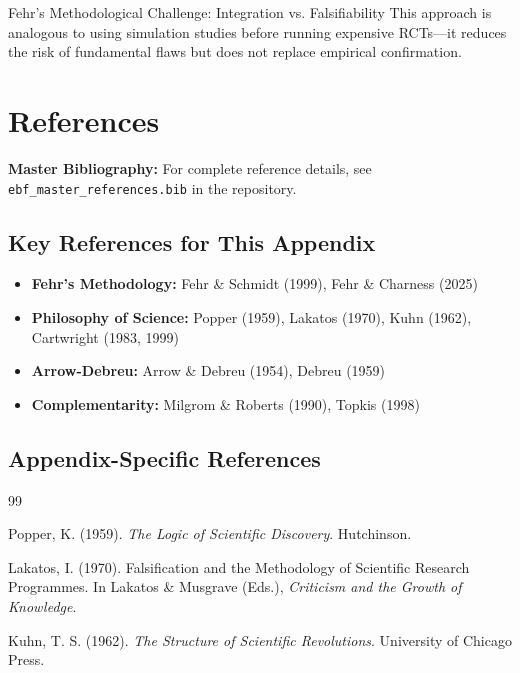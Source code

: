 \begin{chapter}{Fehr's Methodological Challenge: Integration vs. Falsifiability}
This approach is analogous to using simulation studies before running expensive RCTs---it reduces the risk of fundamental flaws but does not replace empirical confirmation.


\section{References}
\label{sec:references}

\begin{tcolorbox}[colback=blue!5!white,colframe=blue!75!black]
\textbf{Master Bibliography:} For complete reference details, see
\texttt{ebf\_master\_references.bib} in the repository.
\end{tcolorbox}

\subsection{Key References for This Appendix}

\begin{itemize}[noitemsep]
    \item \textbf{Fehr's Methodology:} Fehr \& Schmidt (1999), Fehr \& Charness (2025)
    \item \textbf{Philosophy of Science:} Popper (1959), Lakatos (1970), Kuhn (1962), Cartwright (1983, 1999)
    \item \textbf{Arrow-Debreu:} Arrow \& Debreu (1954), Debreu (1959)
    \item \textbf{Complementarity:} Milgrom \& Roberts (1990), Topkis (1998)
\end{itemize}

\subsection{Appendix-Specific References}

\begin{thebibliography}{99}

 Popper, K. (1959). \textit{The Logic of Scientific Discovery}. Hutchinson.

 Lakatos, I. (1970). Falsification and the Methodology of Scientific Research Programmes. In Lakatos \& Musgrave (Eds.), \textit{Criticism and the Growth of Knowledge}.

 Kuhn, T. S. (1962). \textit{The Structure of Scientific Revolutions}. University of Chicago Press.


\end{thebibliography}
\end{chapter}
